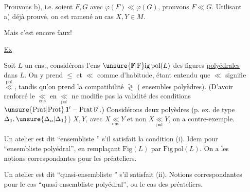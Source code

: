 Prouvons b), i.e. soient $F,G$ avec $\varphi(F)\ll\varphi(G)$, prouvons $F\ll G$.  Utilisant a) déjà prouvé, on est ramené au cas $X,Y\in M$.

Mais c'est encore faux!

\uline{Ex} 

Soit $L$ un ens., considérons l'ens $\unsure{\mathbb{F}|\mathrm{F}}\mathrm{ig}\,\mathrm{pol}(L)$ des figures \uline{polyédrales} dans $L$. On y prend $\leq$ et $\ll$ comme d'habitude, étant entendu que $\ll$ signifie $\overset{\mathrm{pol}}{\ll}$, tandis qu'on prend la compatibilité $\gtrless$ \uline{} (  ensembles  polyèdres). (D'avoir renforcé le $\underset{\mathrm{ens}}{\ll}$ en $\underset{\mathrm{pol}}{\ll}$ ne modifie pas la validité des conditions $\unsure{\mathrm{Prat}|\mathrm{Prot}}\,1'-\mathrm{Prat}\,6'$.) Considérons deux  polyèdres (p. ex. de  type $\Delta_1,\unsure{\Delta_n|\Delta_1}$) $X,Y$, avec $X\underset{\mathrm{ens}}{\ll}Y$ et non $X\underset{\mathrm{pol}}{\ll}Y$, on a  contre-exemple.


\uline{} Un atelier est dit ``ensembliste '' s'il satisfait la condition (i). Idem pour ``ensembliste polyédral'', en remplaçant $\mathrm{Fig}(L)$ par $\mathrm{Fig}\,\mathrm{pol}(L)$. On a les  notions correspondantes pour les préateliers.


Un atelier est dit ``quasi-ensembliste '' s'il satisfait (ii). Notions correspondantes pour le cas ``quasi-ensembliste polyédral'', ou le cas des préateliers.


